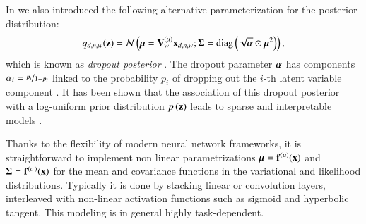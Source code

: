 In \cite{Antelmi2019} we also introduced the following alternative parameterization for the posterior distribution:
\begin{equation}
\label{eq:dropout_posterior}
    q_{d,n,w}(\mathbf{z}) = \mathcal{N}\left(\boldsymbol{\mu} = \mathbf{V}_w^{(\mu)} \mathbf{x}_{d,n,w};\boldsymbol{\Sigma} = \operatorname{diag}\left(\sqrt{\boldsymbol{\alpha}} \odot \boldsymbol{\mu}^2\right)\right),
\end{equation}
which is known as \textit{dropout posterior} \citep{Kingma2015}.
The dropout parameter $\boldsymbol{\alpha}$ has components $\alpha_i = \nicefrac{p_i}{1-p_i}$ linked to the probability $p_i$ of dropping out the $i$-th latent variable component \citep{Wang2013}.
It has been shown that the association of this dropout posterior with a log-uniform prior distribution $p\left(\mathbf{z}\right)$ leads to sparse and interpretable models \citep{Molchanov2017,Garbarino2021}.

Thanks to the flexibility of modern neural network frameworks,
it is straightforward to implement non linear parametrizations $\boldsymbol{\mu} = \mathbf{f}^{(\mu)}(\mathbf{x})$ and $\boldsymbol{\Sigma} = \mathbf{f}^{(\sigma)}(\mathbf{x})$ for the mean and covariance functions in the variational and likelihood distributions.
Typically it is done by stacking linear or convolution layers, interleaved with non-linear activation functions such as sigmoid and hyperbolic tangent.
This modeling is in general highly task-dependent.
